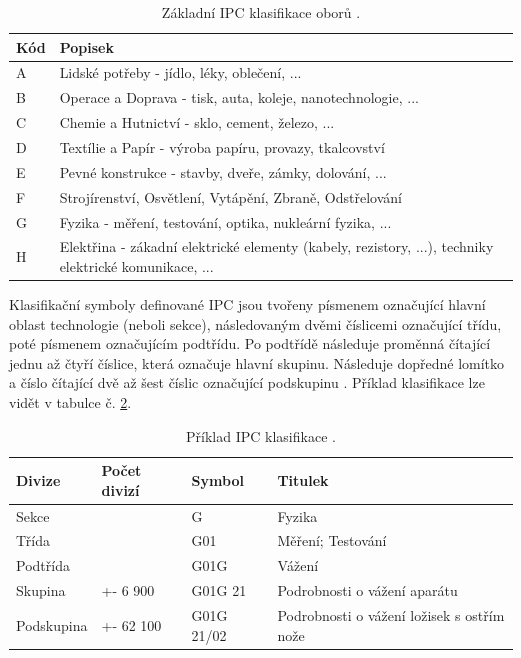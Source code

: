 	\begin{table}[H]
	\centering
	\begin{tabular}{|>{\centering\arraybackslash}p{1cm}|>{\centering\arraybackslash}p{12cm}|}
	\hline
	\textbf{Kód}    & \textbf{Popisek}\\
	\hline
	A & Lidské potřeby - jídlo, léky, oblečení, ... \\
	\hline
	B & Operace a Doprava - tisk, auta, koleje, nanotechnologie, ...\\
	\hline
	C & Chemie a Hutnictví - sklo, cement, železo, ...\\
	\hline
	D & Textílie a Papír - výroba papíru, provazy, tkalcovství \\
	\hline
	E & Pevné konstrukce -  stavby, dveře, zámky, dolování, ... \\
	\hline
	F & Strojírenství, Osvětlení, Vytápění, Zbraně, Odstřelování \\
	\hline
	G & Fyzika -  měření, testování, optika, nukleární fyzika, ...\\
	\hline
	H & Elektřina - zákadní elektrické elementy (kabely, rezistory, ...), techniky elektrické komunikace, ...  \\
	\hline
	\end{tabular}
	\caption{Základní \gls{IPC} klasifikace oborů \cite{ipc_class}.}
	\label{tab:kind_codes}
	\end{table}

\noindent Klasifikační symboly definované \gls{IPC} jsou tvořeny písmenem označující hlavní oblast technologie (neboli sekce), následovaným dvěmi číslicemi označující třídu, poté písmenem označujícím podtřídu. Po podtřídě následuje proměnná čítající jednu až čtyří číslice, která označuje hlavní skupinu. Následuje dopředné lomítko a číslo čítající dvě až šest číslic označující podskupinu \cite{espacenetIPC}. Příklad klasifikace lze vidět v tabulce č. \ref{tab:ipc_example}.

	\begin{table}[H]
	\centering
	\begin{tabular}{|>{\centering\arraybackslash}p{2cm}|>{\centering\arraybackslash}p{2cm}|>{\centering\arraybackslash}p{2.5cm}|>{\centering\arraybackslash}p{6cm}|}
	\hline
	\textbf{Divize}    & \textbf{Počet divizí} & \textbf{Symbol} & \textbf{Titulek} \\
	\hline
	Sekce & 8 & G & Fyzika \\
	\hline
	Třída & 120 & G01 & Měření; Testování \\
	\hline
	Podtřída & 628 & G01G & Vážení \\
	\hline
	Skupina & +- 6 900 & G01G 21 & Podrobnosti o vážení aparátu \\
	\hline
	Podskupina & +- 62 100 & G01G 21/02 & Podrobnosti o vážení ložisek s ostřím nože   \\
	\hline
	\end{tabular}
	\caption{Příklad \gls{IPC} klasifikace \cite{ipcTable}.}
	\label{tab:ipc_example}
	\end{table}

